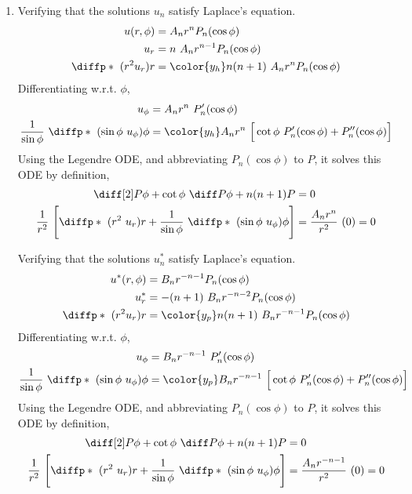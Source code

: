\begin{enumerate}
    \item Verifying that the solutions $ u_n $ satisfy Laplace's equation.
          \begin{align}
              u(r, \phi)             & = A_n r^n P_n(\cos\phi)        \\
              u_{r}                  & = n\ A_n r^{n-1} P_n(\cos\phi) \\
              \diffp*{\ (r^2u_r)}{r} & = \color{y_h} n(n+1)
              \ A_n r^{n}P_n(\cos\phi)
          \end{align}
          Differentiating w.r.t. $ \phi $,
          \begin{align}
              u_\phi                       & = A_nr^n\ P_n'(\cos\phi)            \\
              \frac{1}{\sin\phi}\ \diffp*
              {\ (\sin\phi\ u_\phi)}{\phi} & = \color{y_h} A_nr^n\ \Big[\cot\phi
                  \ P_n'(\cos\phi) + P_n''(\cos\phi)\Big]
          \end{align}
          Using the Legendre ODE, and abbreviating $ P_n(\cos\phi) $ to $ P $, it solves
          this ODE by definition,
          \begin{align}
              \diff[2] P\phi + \cot\phi\ \diff P\phi + n(n+1)P & = 0                  \\
              \frac{1}{r^2}\ \Bigg[ \diffp*{\ (r^2\ u_r)}{r} + \frac{1}{\sin\phi}
              \ \diffp*{\ (\sin\phi\ u_\phi)}{\phi} \Bigg]     & = \frac{A_nr^n}{r^2}
              \ (0) = 0
          \end{align}

          Verifying that the solutions $ u_n^* $ satisfy Laplace's equation.
          \begin{align}
              u^*(r, \phi)           & = B_n r^{-n-1} P_n(\cos\phi)         \\
              u^*_{r}                & = -(n+1)\ B_n r^{-n-2} P_n(\cos\phi) \\
              \diffp*{\ (r^2u_r)}{r} & = \color{y_p} n(n+1)
              \ B_n r^{-n-1}P_n(\cos\phi)
          \end{align}
          Differentiating w.r.t. $ \phi $,
          \begin{align}
              u_\phi                       & = B_nr^{-n-1}\ P_n'(\cos\phi)            \\
              \frac{1}{\sin\phi}\ \diffp*
              {\ (\sin\phi\ u_\phi)}{\phi} & = \color{y_p} B_nr^{-n-1}\ \Big[\cot\phi
                  \ P_n'(\cos\phi) + P_n''(\cos\phi)\Big]
          \end{align}
          Using the Legendre ODE, and abbreviating $ P_n(\cos\phi) $ to $ P $, it solves
          this ODE by definition,
          \begin{align}
              \diff[2] P\phi + \cot\phi\ \diff P\phi + n(n+1)P & = 0                  \\
              \frac{1}{r^2}\ \Bigg[ \diffp*{\ (r^2\ u_r)}{r} + \frac{1}{\sin\phi}
              \ \diffp*{\ (\sin\phi\ u_\phi)}{\phi} \Bigg]     & = \frac{A_nr^{-n-1}}
              {r^2}\ (0) = 0
          \end{align}


\end{enumerate}
